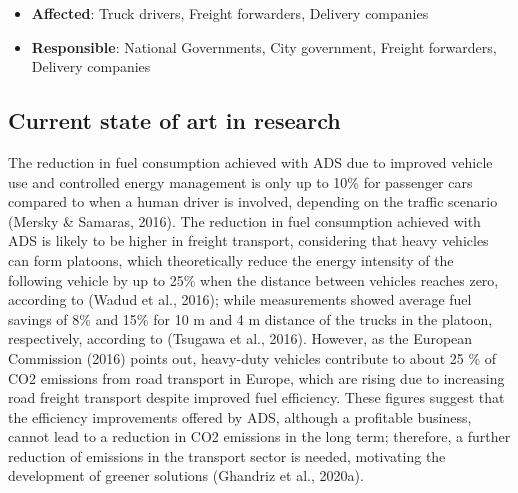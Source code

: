 \documentclass[
]{book}
\providecommand{\tightlist}{%
  \setlength{\itemsep}{0pt}\setlength{\parskip}{0pt}}
\begin{document}
\begin{itemize}
\tightlist
\item
  \textbf{Affected}: Truck drivers, Freight forwarders, Delivery companies
\item
  \textbf{Responsible}: National Governments, City government, Freight forwarders, Delivery companies
\end{itemize}

\hypertarget{current-state-of-art-in-research-22}{%
\subsection*{Current state of art in research}\label{current-state-of-art-in-research-22}}

The reduction in fuel consumption achieved with ADS due to improved vehicle use and controlled energy management is only up to 10\% for passenger cars compared to when a human driver is involved, depending on the traffic scenario (Mersky \& Samaras, 2016). The reduction in fuel consumption achieved with ADS is likely to be higher in freight transport, considering that heavy vehicles can form platoons, which theoretically reduce the energy intensity of the following vehicle by up to 25\% when the distance between vehicles reaches zero, according to (Wadud et al., 2016); while measurements showed average fuel savings of 8\% and 15\% for 10 m and 4 m distance of the trucks in the platoon, respectively, according to (Tsugawa et al., 2016). However, as the European Commission (2016) points out, heavy-duty vehicles contribute to about 25 \% of CO2 emissions from road transport in Europe, which are rising due to increasing road freight transport despite improved fuel efficiency. These figures suggest that the efficiency improvements offered by ADS, although a profitable business, cannot lead to a reduction in CO2 emissions in the long term; therefore, a further reduction of emissions in the transport sector is needed, motivating the development of greener solutions (Ghandriz et al., 2020a).
\end{document}
